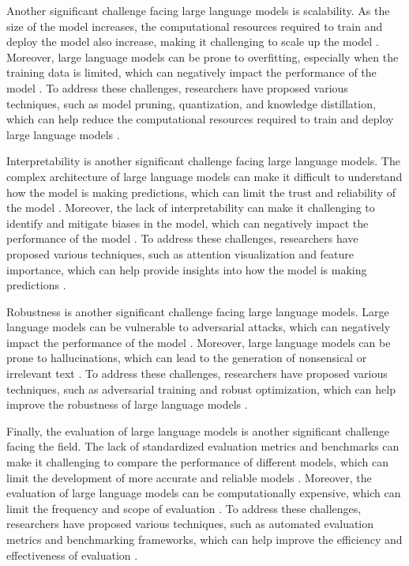 \documentclass[11pt]{article}
\begin{document}
Another significant challenge facing large language models is scalability. As the size of the model increases, the computational resources required to train and deploy the model also increase, making it challenging to scale up the model \cite{ref34}. Moreover, large language models can be prone to overfitting, especially when the training data is limited, which can negatively impact the performance of the model \cite{ref35}. To address these challenges, researchers have proposed various techniques, such as model pruning, quantization, and knowledge distillation, which can help reduce the computational resources required to train and deploy large language models \cite{ref17}.

Interpretability is another significant challenge facing large language models. The complex architecture of large language models can make it difficult to understand how the model is making predictions, which can limit the trust and reliability of the model \cite{ref36}. Moreover, the lack of interpretability can make it challenging to identify and mitigate biases in the model, which can negatively impact the performance of the model \cite{ref37}. To address these challenges, researchers have proposed various techniques, such as attention visualization and feature importance, which can help provide insights into how the model is making predictions \cite{ref38}.

Robustness is another significant challenge facing large language models. Large language models can be vulnerable to adversarial attacks, which can negatively impact the performance of the model \cite{ref39}. Moreover, large language models can be prone to hallucinations, which can lead to the generation of nonsensical or irrelevant text \cite{ref6}. To address these challenges, researchers have proposed various techniques, such as adversarial training and robust optimization, which can help improve the robustness of large language models \cite{ref40}.

Finally, the evaluation of large language models is another significant challenge facing the field. The lack of standardized evaluation metrics and benchmarks can make it challenging to compare the performance of different models, which can limit the development of more accurate and reliable models \cite{ref41}. Moreover, the evaluation of large language models can be computationally expensive, which can limit the frequency and scope of evaluation \cite{ref42}. To address these challenges, researchers have proposed various techniques, such as automated evaluation metrics and benchmarking frameworks, which can help improve the efficiency and effectiveness of evaluation \cite{ref43}.
\end{document}
